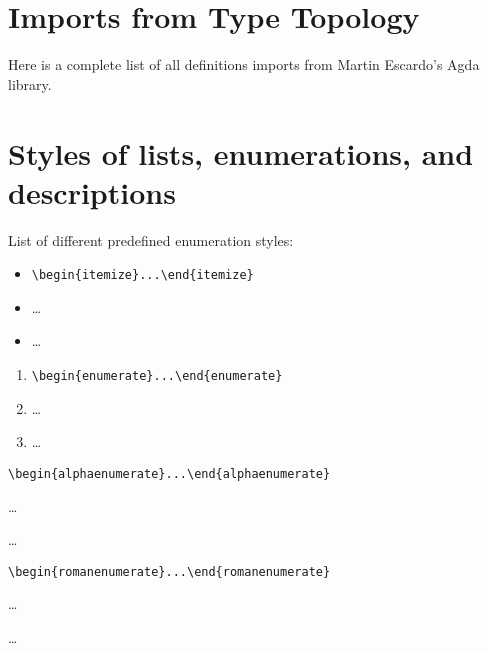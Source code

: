 \documentclass[a4paper,UKenglish,cleveref, autoref, thm-restate]{lipics-v2019}
\begin{document}

\appendix

\section{Imports from Type Topology}\label{sec:imports-from-type-topology}
Here is a complete list of all definitions \agdaualib imports from Martin Escardo's \typetopology Agda library.
\begin{code}  \end{code}

\section{Styles of lists, enumerations, and descriptions}\label{sec:itemStyles}
List of different predefined enumeration styles:

\begin{itemize}
\item \verb|\begin{itemize}...\end{itemize}|
\item \dots
\item \dots
\end{itemize}

\begin{enumerate}
\item \verb|\begin{enumerate}...\end{enumerate}|
\item \dots
\item \dots
\end{enumerate}

\begin{alphaenumerate}
\item \verb|\begin{alphaenumerate}...\end{alphaenumerate}|
\item \dots
\item \dots
\end{alphaenumerate}

\begin{romanenumerate}
\item \verb|\begin{romanenumerate}...\end{romanenumerate}|
\item \dots
\item \dots
\end{romanenumerate}
\end{document}
